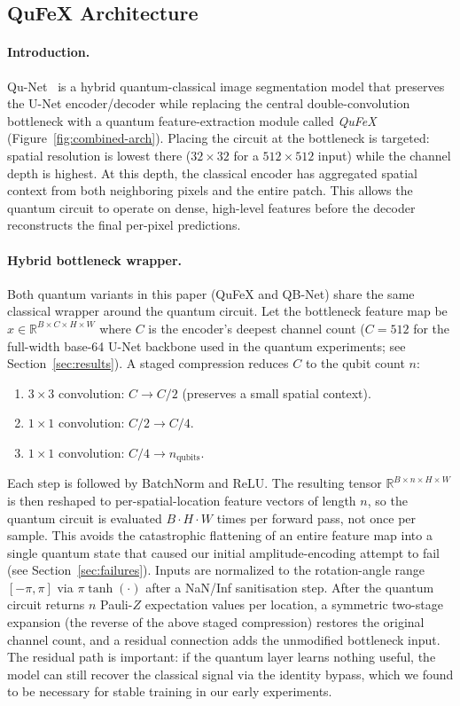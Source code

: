 \documentclass{article}
\begin{document}
\subsection{QuFeX Architecture}
\label{sec:qufex}

\paragraph{Introduction.} Qu-Net~\cite{qufex} is a hybrid quantum-classical image segmentation model that preserves the U-Net encoder/decoder while replacing the central double-convolution bottleneck with a quantum feature-extraction module called \emph{QuFeX} (Figure~\ref{fig:combined-arch}). Placing the circuit at the bottleneck is targeted: spatial resolution is lowest there ($32\times32$ for a $512\times512$ input) while the channel depth is highest. At this depth, the classical encoder has aggregated spatial context from both neighboring pixels and the entire patch. This allows the quantum circuit to operate on dense, high-level features before the decoder reconstructs the final per-pixel predictions.

\paragraph{Hybrid bottleneck wrapper.} Both quantum variants in this paper (QuFeX and QB-Net) share the same classical wrapper around the quantum circuit. Let the bottleneck feature map be $x \in \mathbb{R}^{B \times C \times H \times W}$ where $C$ is the encoder's deepest channel count ($C = 512$ for the full-width base-64 U-Net backbone used in the quantum experiments; see Section~\ref{sec:results}). A staged compression reduces $C$ to the qubit count $n$:
\begin{enumerate}[leftmargin=2em,topsep=2pt,itemsep=0pt]
    \item $3\times3$ convolution: $C \to C/2$ (preserves a small spatial context).
    \item $1\times1$ convolution: $C/2 \to C/4$.
    \item $1\times1$ convolution: $C/4 \to n_{\text{qubits}}$.
\end{enumerate}
Each step is followed by BatchNorm and ReLU. The resulting tensor $\mathbb{R}^{B \times n \times H \times W}$ is then reshaped to per-spatial-location feature vectors of length $n$, so the quantum circuit is evaluated $B \cdot H \cdot W$ times per forward pass, not once per sample. This avoids the catastrophic flattening of an entire feature map into a single quantum state that caused our initial amplitude-encoding attempt to fail (see Section~\ref{sec:failures}). Inputs are normalized to the rotation-angle range $[-\pi, \pi]$ via $\pi\tanh(\cdot)$ after a NaN/Inf sanitisation step. After the quantum circuit returns $n$ Pauli-$Z$ expectation values per location, a symmetric two-stage expansion (the reverse of the above staged compression) restores the original channel count, and a residual connection adds the unmodified bottleneck input. The residual path is important: if the quantum layer learns nothing useful, the model can still recover the classical signal via the identity bypass, which we found to be necessary for stable training in our early experiments.
\end{document}
